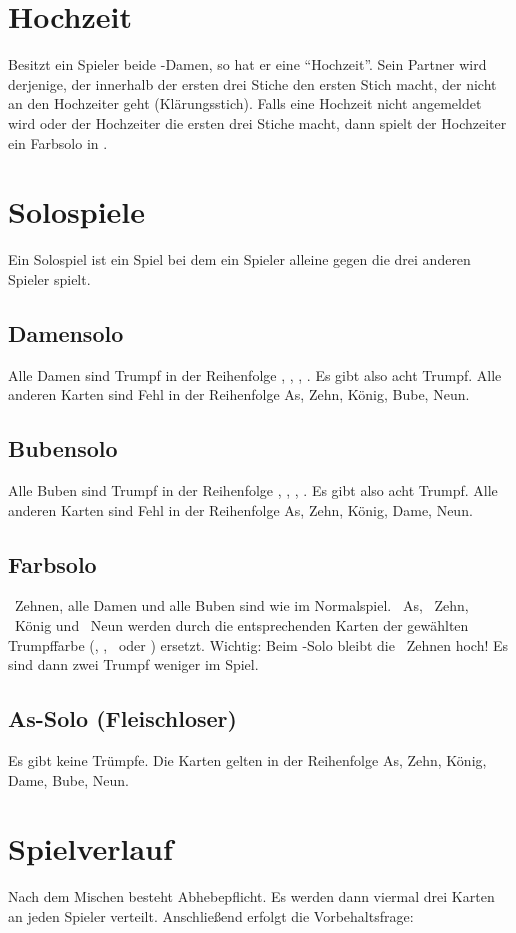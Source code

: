 \documentclass[12pt]{scrartcl}
\begin{document}
\section{Hochzeit}
Besitzt ein Spieler beide \Kreuz-Damen, so hat er eine "`Hochzeit"'. Sein Partner wird derjenige, der innerhalb der ersten drei Stiche den ersten Stich macht, der nicht an den Hochzeiter geht (Klärungsstich). Falls eine Hochzeit nicht angemeldet wird oder der Hochzeiter die ersten drei Stiche macht, dann spielt der Hochzeiter ein Farbsolo in \Karo.

\section{Solospiele}
Ein Solospiel ist ein Spiel bei dem ein Spieler alleine gegen die drei anderen Spieler spielt.

\subsection{Damensolo}
Alle Damen sind Trumpf in der Reihenfolge \Kreuz, \Pik, \Herz, \Karo. Es gibt also acht Trumpf. Alle anderen Karten sind Fehl in der Reihenfolge As, Zehn, König, Bube, Neun.

\subsection{Bubensolo}
Alle Buben sind Trumpf in der Reihenfolge \Kreuz, \Pik, \Herz, \Karo. Es gibt also acht Trumpf. Alle anderen Karten sind Fehl in der Reihenfolge As, Zehn, König, Dame, Neun.

\subsection{Farbsolo}
\Herz\ Zehnen, alle Damen und alle Buben sind wie im Normalspiel. \Karo\ As, \Karo\ Zehn, \Karo\ König und \Karo\ Neun werden durch die entsprechenden Karten der gewählten Trumpffarbe (\Kreuz, \Pik, \Herz\ oder \Karo) ersetzt. Wichtig: Beim \Herz-Solo bleibt die \Herz\ Zehnen hoch! Es sind dann zwei Trumpf weniger im Spiel.

\subsection{As-Solo (Fleischloser)}
Es gibt keine Trümpfe. Die Karten gelten in der Reihenfolge As, Zehn, König, Dame, Bube, Neun.

\section{Spielverlauf} Nach dem
Mischen besteht Abhebepflicht. Es werden dann viermal drei Karten an jeden Spieler verteilt. Anschließend erfolgt die Vorbehaltsfrage:
\end{document}
